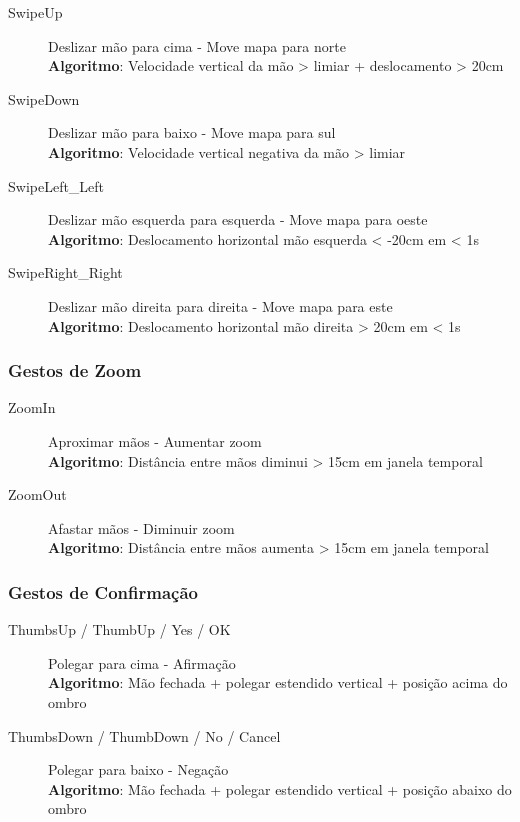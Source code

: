 \begin{description}
    \item[SwipeUp] Deslizar mão para cima - Move mapa para norte \\
    \textbf{Algoritmo}: Velocidade vertical da mão > limiar + deslocamento > 20cm

    \item[SwipeDown] Deslizar mão para baixo - Move mapa para sul \\
    \textbf{Algoritmo}: Velocidade vertical negativa da mão > limiar

    \item[SwipeLeft\_Left] Deslizar mão esquerda para esquerda - Move mapa para oeste \\
    \textbf{Algoritmo}: Deslocamento horizontal mão esquerda < -20cm em < 1s

    \item[SwipeRight\_Right] Deslizar mão direita para direita - Move mapa para este \\
    \textbf{Algoritmo}: Deslocamento horizontal mão direita > 20cm em < 1s
\end{description}

\subsubsection{Gestos de Zoom}

\begin{description}
    \item[ZoomIn] Aproximar mãos - Aumentar zoom \\
    \textbf{Algoritmo}: Distância entre mãos diminui > 15cm em janela temporal

    \item[ZoomOut] Afastar mãos - Diminuir zoom \\
    \textbf{Algoritmo}: Distância entre mãos aumenta > 15cm em janela temporal
\end{description}

\subsubsection{Gestos de Confirmação}

\begin{description}
    \item[ThumbsUp / ThumbUp / Yes / OK] Polegar para cima - Afirmação \\
    \textbf{Algoritmo}: Mão fechada + polegar estendido vertical + posição acima do ombro

    \item[ThumbsDown / ThumbDown / No / Cancel] Polegar para baixo - Negação \\
    \textbf{Algoritmo}: Mão fechada + polegar estendido vertical + posição abaixo do ombro
\end{description}

